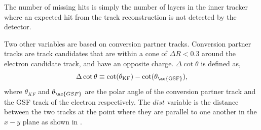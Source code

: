 The number of missing hits is simply the number of layers in the inner
tracker where an expected hit from the track reconstruction is not detected by
the detector.

Two other variables are based on conversion partner tracks.
Conversion partner tracks are track candidates that are within a cone of $\Delta
R < 0.3$ around the electron candidate track, and have an opposite charge. 
$\Delta\cot\theta$ is defined as,
\begin{equation}
\Delta \cot \theta \equiv \cot(\theta_{\text{KF}}) - \cot(\theta_{\text{\ac{GSF}}}),
\end{equation}
where $\theta_{KF}$ and $\theta_{\ac{GSF}}$ are the polar angle of the conversion
partner track and the \ac{GSF} track of the electron respectively.
The $dist$ variable is the distance between the two tracks at the point where
they are parallel to one another in the $x-y$ plane as shown in .


